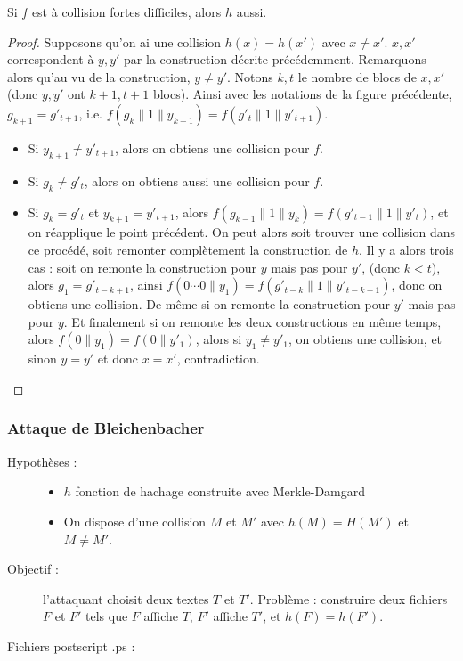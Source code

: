            \begin{theo}
                Si $f$ est à collision fortes difficiles, alors $h$ aussi.
            \end{theo}
            \begin{proof}
                Supposons qu'on ai une collision $h(x) = h(x')$ avec $x \neq x'$. $x,x'$ correspondent à $y,y'$ par la construction décrite précédemment. Remarquons alors qu'au vu de la construction, $y \neq y'$. Notons $k,t$ le nombre de blocs de $x,x'$ (donc $y,y'$ ont $k + 1, t + 1$ blocs). Ainsi avec les notations de la figure précédente, $g_{k + 1} = g'_{t + 1}$, i.e. $f(g_k \| 1 \| y_{k + 1}) = f(g'_t \| 1 \| y'_{t + 1})$.
                \begin{itemize}
                    \item Si $y_{k + 1} \neq y'_{t + 1}$, alors on obtiens une collision pour $f$.
                    \item Si $g_k \neq g'_t$, alors on obtiens aussi une collision pour $f$.
                    \item Si $g_k = g'_t$ et $y_{k + 1} = y'_{t + 1}$, alors $f(g_{k - 1} \| 1 \| y_k) = f(g'_{t - 1} \| 1 \| y'_t)$, et on réapplique le point précédent. On peut alors soit trouver une collision dans ce procédé, soit remonter complètement la construction de $h$. Il y a alors trois cas : soit on remonte la construction pour $y$ mais pas pour $y'$, (donc $k < t$), alors $g_1 = g'_{t - k + 1}$, ainsi $f(0 \cdots 0 \| y_1) = f(g'_{t - k} \| 1 \| y'_{t - k + 1})$, donc on obtiens une collision. De même si on remonte la construction pour $y'$ mais pas pour $y$. Et finalement si on remonte les deux constructions en même temps, alors $f(0 \| y_1) = f(0 \| y'_1)$, alors si $y_1 \neq y'_1$, on obtiens une collision, et sinon $y = y'$ et donc $x = x'$, contradiction.
                \end{itemize}
            \end{proof}
            
            \subsubsection{Attaque de Bleichenbacher}
                \begin{description}
                    \item[Hypothèses :] 
                    \begin{itemize}
                        \item $h$ fonction de hachage construite avec Merkle-Damgard
                        \item On dispose d'une collision $M$ et $M'$ avec $h(M) = H(M')$ et $M \neq M'$.
                    \end{itemize}
                    \item[Objectif :] l'attaquant choisit deux textes $T$ et $T'$. Problème : construire deux fichiers $F$ et $F'$ tels que $F$ affiche $T$, $F'$ affiche $T'$, et $h(F) = h(F')$.
                \end{description}
                Fichiers postscript .ps :
                
